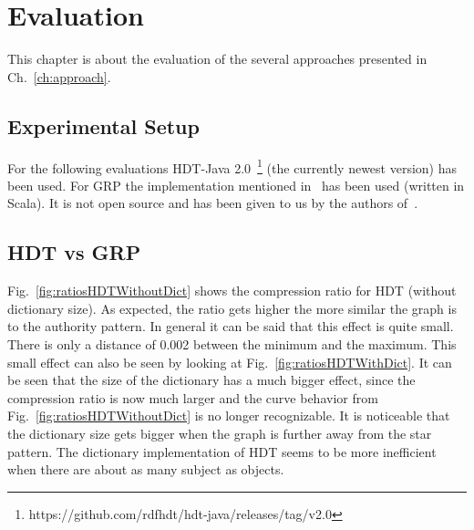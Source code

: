 \chapter{Evaluation}\label{ch:evaluation}

This chapter is about the evaluation of the several approaches presented in Ch.~\ref{ch:approach}.

\section{Experimental Setup}

For the following evaluations HDT-Java 2.0~\footnote{\label{foot:1}https://github.com/rdfhdt/hdt-java/releases/tag/v2.0} (the currently newest version) has been used. For GRP the implementation mentioned in~\cite{maneth} has been used (written in Scala). It is not open source and has been given to us by the authors of~\cite{maneth}.

\section{HDT vs GRP}\label{sec:evaluationHDTvsGRP}


Fig.~\ref{fig:ratiosHDTWithoutDict} shows the compression ratio for HDT (without dictionary size). As expected, the ratio gets higher the more similar the graph is to the authority pattern. In general it can be said that this effect is quite small. There is only a distance of 0.002 between the minimum and the maximum. This small effect can also be seen by looking at Fig.~\ref{fig:ratiosHDTWithDict}. It can be seen that the size of the dictionary has a much bigger effect, since the compression ratio is now much larger and the curve behavior from Fig.~\ref{fig:ratiosHDTWithoutDict} is no longer recognizable. It is noticeable that the dictionary size gets bigger when the graph is further away from the star pattern. The dictionary implementation of HDT seems to be more inefficient when there are about as many subject as objects. 


